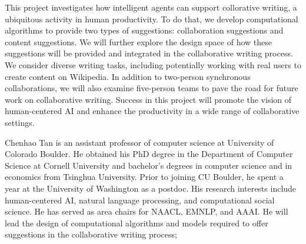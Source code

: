 







This project investigates how intelligent agents can support collorative writing, a ubiquitous activity in human productivity.
To do that, we develop computational algorithms to provide two types of suggestions: collaboration suggestions and content suggestions.
We will further explore the design space of how these suggestions will be provided and integrated in the collaborative writing process.
We consider diverse writing tasks, including potentially working with real users to create content on Wikipedia.
In addition to two-person synchronous collaborations, we will also examine five-person teams to pave the road for future work on collaborative writing.
Success in this project will promote the vision of human-centered AI and enhance the productivity in a wide range of collaborative settings.

Chenhao Tan is an assistant professor of computer science at University of Colorado Boulder. He obtained his PhD degree in the Department of Computer Science at Cornell University and bachelor's degrees in computer science and in economics from Tsinghua University. Prior to joining CU Boulder, he spent a year at the University of Washington as a postdoc. His research interests include human-centered AI, natural language processing, and computational social science. 
He has served as area chairs for NAACL, EMNLP, and AAAI.
He will lead the design of computational algorithms and models required to offer suggestions in the collaborative writing process;
